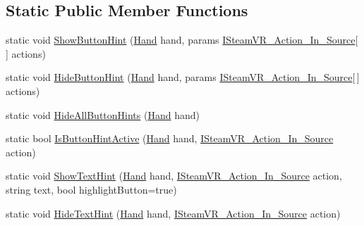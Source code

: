 \subsection*{Static Public Member Functions}
\begin{DoxyCompactItemize}
\item 
static void \mbox{\hyperlink{class_valve_1_1_v_r_1_1_interaction_system_1_1_controller_button_hints_afd53eaebcf77a92658798083cec70efb}{Show\+Button\+Hint}} (\mbox{\hyperlink{class_valve_1_1_v_r_1_1_interaction_system_1_1_hand}{Hand}} hand, params \mbox{\hyperlink{interface_valve_1_1_v_r_1_1_i_steam_v_r___action___in___source}{I\+Steam\+V\+R\+\_\+\+Action\+\_\+\+In\+\_\+\+Source}}\mbox{[}$\,$\mbox{]} actions)
\item 
static void \mbox{\hyperlink{class_valve_1_1_v_r_1_1_interaction_system_1_1_controller_button_hints_a9251a64a30783b3698e77756b7c8015a}{Hide\+Button\+Hint}} (\mbox{\hyperlink{class_valve_1_1_v_r_1_1_interaction_system_1_1_hand}{Hand}} hand, params \mbox{\hyperlink{interface_valve_1_1_v_r_1_1_i_steam_v_r___action___in___source}{I\+Steam\+V\+R\+\_\+\+Action\+\_\+\+In\+\_\+\+Source}}\mbox{[}$\,$\mbox{]} actions)
\item 
static void \mbox{\hyperlink{class_valve_1_1_v_r_1_1_interaction_system_1_1_controller_button_hints_a9f0a9b2269509333a344a4af3238586f}{Hide\+All\+Button\+Hints}} (\mbox{\hyperlink{class_valve_1_1_v_r_1_1_interaction_system_1_1_hand}{Hand}} hand)
\item 
static bool \mbox{\hyperlink{class_valve_1_1_v_r_1_1_interaction_system_1_1_controller_button_hints_ada4167a32d9f46f9449972d3e32fd625}{Is\+Button\+Hint\+Active}} (\mbox{\hyperlink{class_valve_1_1_v_r_1_1_interaction_system_1_1_hand}{Hand}} hand, \mbox{\hyperlink{interface_valve_1_1_v_r_1_1_i_steam_v_r___action___in___source}{I\+Steam\+V\+R\+\_\+\+Action\+\_\+\+In\+\_\+\+Source}} action)
\item 
static void \mbox{\hyperlink{class_valve_1_1_v_r_1_1_interaction_system_1_1_controller_button_hints_a8b844addfa29feab6b59064e322a0ca8}{Show\+Text\+Hint}} (\mbox{\hyperlink{class_valve_1_1_v_r_1_1_interaction_system_1_1_hand}{Hand}} hand, \mbox{\hyperlink{interface_valve_1_1_v_r_1_1_i_steam_v_r___action___in___source}{I\+Steam\+V\+R\+\_\+\+Action\+\_\+\+In\+\_\+\+Source}} action, string text, bool highlight\+Button=true)
\item 
static void \mbox{\hyperlink{class_valve_1_1_v_r_1_1_interaction_system_1_1_controller_button_hints_a25bef79c295ed33b6ea4719007a9a7bc}{Hide\+Text\+Hint}} (\mbox{\hyperlink{class_valve_1_1_v_r_1_1_interaction_system_1_1_hand}{Hand}} hand, \mbox{\hyperlink{interface_valve_1_1_v_r_1_1_i_steam_v_r___action___in___source}{I\+Steam\+V\+R\+\_\+\+Action\+\_\+\+In\+\_\+\+Source}} action)

\end{DoxyCompactItemize}
